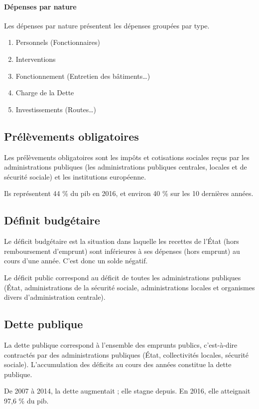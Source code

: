\documentclass[10pt,a4paper,french]{article}
\begin{document}
\paragraph{Dépenses par nature}
Les dépenses par nature présentent les dépenses groupées par type.
\begin{enumerate}
\item Personnels (Fonctionnaires)
\item Interventions
\item Fonctionnement (Entretien des bâtiments\ldots)
\item Charge de la Dette
\item Investissements (Routes\ldots)
\end{enumerate}

\subsection{Prélèvements obligatoires}
Les prélèvements obligatoires sont les impôts et cotisations sociales reçus par les administrations publiques (les administrations publiques centrales, locales et de sécurité sociale) et les institutions européenne.

Ils représentent 44 \% du \gls{pib} en 2016, et environ 40 \% sur les 10 dernières années.

\subsection{Définit budgétaire}
Le déficit budgétaire est la situation dans laquelle les recettes de l’État (hors remboursement d’emprunt) sont inférieures à ses dépenses (hors emprunt) au cours d’une année. C’est donc un solde négatif.

Le déficit public correspond au déficit de toutes les administrations publiques (État, administrations de la sécurité sociale, administrations locales et organismes divers d’administration centrale).

\subsection{Dette publique}
La dette publique correspond à l’ensemble des emprunts publics, c’est-à-dire contractés par des administrations publiques (État, collectivités locales, sécurité sociale). L’accumulation des déficits au cours
des années constitue la dette publique.

De 2007 à 2014, la dette augmentait ; elle stagne depuis. En 2016, elle atteignait 97,6 \% du \gls{pib}.
\end{document}
